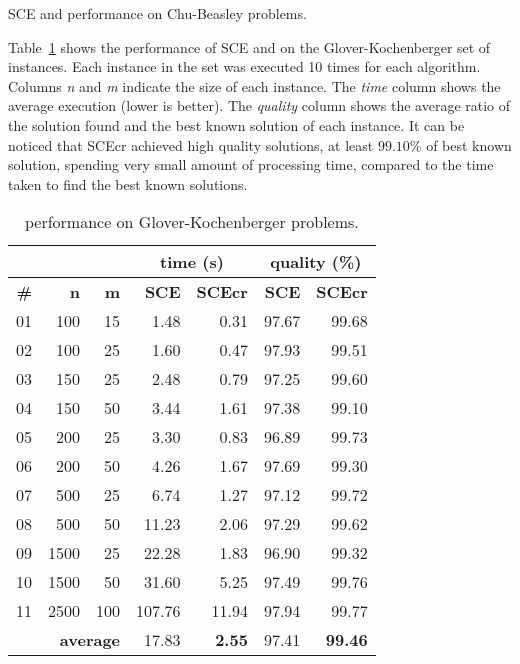 \begin{table}
{
\renewcommand{\arraystretch}{1.3}%
\fontsize{8.5pt}{1em}\selectfont 
\begin{center}
  
\end{center}
}
 \caption{SCE and \scecore  performance on Chu-Beasley problems.}
 \label{tab:chu}
\end{table}

Table~\ref{tab:gk} shows the performance of SCE and \scecore on the Glover-Kochenberger set of instances.
Each instance in the set was executed 10 times for each algorithm.
Columns \textit{n} and \textit{m} indicate the size of each instance.
The \textit{time} column shows the average execution (lower is better).
The \textit{quality} column shows the average ratio of the solution found and
the best known solution of each instance.
It can be noticed that SCEcr achieved high quality solutions, at least $99.10\%$
of best known solution, spending very small amount of processing time, compared
to the time taken to find the best known solutions.

\begin{table}
{
\renewcommand{\arraystretch}{1.7}%
\fontsize{8.5pt}{1em}\selectfont 
\begin{center}
\begin{tabular}{|r|r|r|r|r|r|r|} \cline{4-7}
		\multicolumn{3}{c|}{} & \multicolumn{2}{c|}{\bf time (s)} & \multicolumn{2}{c|}{\bf quality (\%)} \\ \hline
		\textbf{\#} & \textbf{n}   & \textbf{m}  & {\bf SCE } & {\bf SCEcr } & {\bf SCE} & {\bf SCEcr} \\ \hline
01 & 100 & 15 & 1.48   & 0.31 & 97.67 &  99.68 \\ \hline
02 & 100 & 25 & 1.60   & 0.47 & 97.93 &  99.51 \\ \hline
03 & 150 & 25 & 2.48   & 0.79 & 97.25 &  99.60 \\ \hline
04 & 150 & 50 & 3.44   & 1.61 & 97.38 &  99.10 \\ \hline
05 & 200 & 25 & 3.30   & 0.83 & 96.89 &  99.73 \\ \hline
06 & 200 & 50 & 4.26   & 1.67 & 97.69 &  99.30 \\ \hline
07 & 500 & 25 & 6.74   & 1.27 & 97.12 &  99.72 \\ \hline
08 & 500 & 50 & 11.23  & 2.06 & 97.29 &  99.62 \\ \hline
09 &1500 & 25 & 22.28  & 1.83 & 96.90 &  99.32 \\ \hline
10 &1500 & 50 & 31.60  & 5.25 & 97.49 &  99.76 \\ \hline
11 &2500 &100 &107.76  &11.94 & 97.94 & 99.77 \\ \hline
    \multicolumn{3}{|r|}{\textbf{average }} & {17.83} & \multicolumn{1}{r|}{\bf 2.55 } & {97.41} & {\bf 99.46}  \\ \hline
\end{tabular}
\end{center}
}
 \caption{\scecore performance on Glover-Kochenberger problems.}
 \label{tab:gk}
\end{table}

